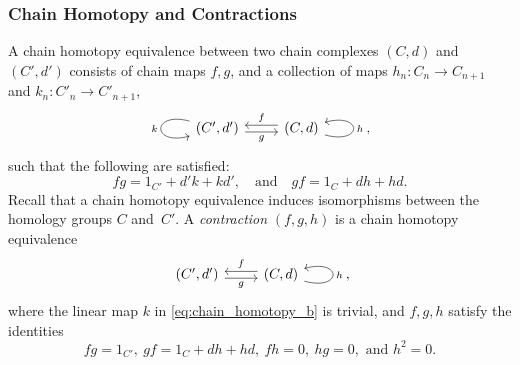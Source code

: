 \documentclass[11pt, table, nothms]{amsart}
\theoremstyle{definition}
\begin{document}
{\subsubsection{Chain Homotopy and Contractions}
A chain homotopy equivalence between two chain complexes $(C, d)$ and $(C',d')$ consists of chain maps $f,g$, and a collection of maps $h_n: C_n \to C_{n+1}$ and $k_n: C'_n \to C'_{n+1}$, 
\begin{equation}\label{eq:chain_homotopy}
    \begin{tikzcd}[ampersand replacement=\&]
	(C',d') \& (C,d)
	\arrow["k"', from=1-1, to=1-1, loop, in=195, out=165, distance=10mm]
	\arrow["g"', shift right, from=1-1, to=1-2]
	\arrow["f"', shift right, from=1-2, to=1-1]
	\arrow["h"', from=1-2, to=1-2, loop, in=15, out=345, distance=10mm]
    \end{tikzcd},
\end{equation}
such that the following are satisfied: 
\begin{equation}\label{eq:chain_homotopy_b}
fg = 1_{C'} + d'k  + kd',\quad \text{and} \quad 
gf = 1_C + dh + hd.
\end{equation}
Recall that a chain homotopy equivalence induces isomorphisms between the homology groups $C$ and~$C'$. A  \emph{contraction} $(f,g,h)$ is a chain homotopy equivalence  
\begin{equation} \label{eq:contraction}
    \begin{tikzcd}[ampersand replacement=\&]
	(C',d') \& (C,d)
	\arrow["g"', shift right, from=1-1, to=1-2]
	\arrow["f"', shift right, from=1-2, to=1-1]
	\arrow["h"', from=1-2, to=1-2, loop, in=15, out=345, distance=10mm]
\end{tikzcd},
\end{equation}
 where the linear map $k$ in \cref{eq:chain_homotopy_b} is trivial, and $f,g,h$ satisfy the identities
\begin{equation}\label{eq:contraction_b}
fg = 1_{C'},\   
gf = 1_C + dh + hd,\ 
fh = 0,\  
hg = 0,\mbox{ and } 
h^2=0.
\end{equation}

}
\end{document}
